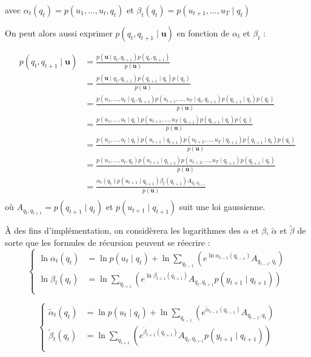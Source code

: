 \documentclass[12pt,a4paper,onecolumn]{article}
\begin{document}
avec \(\alpha_t(q_t) = p(u_1,\dots,u_t, q_t)\) et \(\beta_t(q_t) = p(u_{t+1},\dots,u_T \mid q_t)\)

On peut alors aussi exprimer \(p(q_t, q_{t+1} \mid \bm{u})\) en fonction de \(\alpha_t\) et \(\beta_t\) :

\begin{equation}
	\begin{split}
		p(q_t, q_{t+1} \mid \bm{u}) &= \frac{p(\bm{u} \mid q_t, q_{t+1}) p (q_t, q_{t+1})}{p(\bm{u})}\\
		&= \frac{p(\bm{u} \mid q_t, q_{t+1}) p (q_{t+1} \mid q_t) p (q_t)}{p(\bm{u})}\\
		&= \frac{p(u_1, \dots, u_t \mid q_t, q_{t+1}) p(u_{t+1}, \dots, u_T \mid q_t, q_{t+1}) p(q_{t+1} \mid q_t) p (q_t)}{p(\bm{u})}\\
		&= \frac{p(u_1, \dots, u_t \mid q_t) p(u_{t+1}, \dots, u_T \mid q_{t+1}) p(q_{t+1} \mid q_t) p (q_t)}{p(\bm{u})}\\
		&= \frac{p(u_1, \dots, u_t \mid q_t) p(u_{t+1} \mid q_{t+1}) p(u_{t+2}, \dots, u_T \mid q_{t+1}) p(q_{t+1} \mid q_t) p (q_t)}{p(\bm{u})}\\
		&= \frac{p(u_1, \dots, u_t, q_t) p(u_{t+1} \mid q_{t+1}) p(u_{t+2}, \dots, u_T \mid q_{t+1}) p(q_{t+1} \mid q_t)}{p(\bm{u})}\\
		&= \frac{\alpha_t(q_t) p(u_{t+1} \mid q_{t+1}) \beta_t(q_{t+1}) A_{q_t, q_{t+1}}}{p(\bm{u})}\\
	\end{split}
\end{equation}
où \(A_{q_t, q_{t+1}} = p(q_{t+1} \mid q_t)\) et \(p(u_{t+1} \mid q_{t+1})\) suit une loi gaussienne.

À des fins d'implémentation, on considèrera les logarithmes des \(\alpha\) et \(\beta\), \(\tilde{\alpha}\) et \(\tilde{\beta}\) de sorte que les formules de récursion peuvent se réecrire :
\begin{equation}
	\left\{
	\begin{split}
		\ln\alpha_t(q_t) &= \ln p(u_t \mid q_t) + \ln\sum_{q_{t-1}}\left(e^{\ln \alpha_{t-1}(q_{t-1})}A_{q_{t-1}, q_{t}}\right)\\
		\ln\beta_t(q_t) &= \ln\sum_{q_{t+1}}\left(e^{\ln \beta_{t+1}(q_{t+1})}A_{q_{t}, q_{t+1}}p(y_{t+1}\mid q_{t+1})\right)\\
	\end{split}
	\right.
\end{equation}

\begin{equation}
	\left\{
	\begin{split}
		\tilde{\alpha}_t(q_t) &= \ln p(u_t \mid q_t) + \ln\sum_{q_{t-1}}\left(e^{\tilde{\alpha}_{t-1}(q_{t-1})}A_{q_{t-1}, q_{t}}\right)\\
		\tilde{\beta}_t(q_t) &= \ln\sum_{q_{t+1}}\left(e^{\tilde{\beta}_{t+1}(q_{t+1})}A_{q_{t}, q_{t+1}}p(y_{t+1}\mid q_{t+1})\right)\\
	\end{split}
	\right.
\end{equation}
\end{document}

